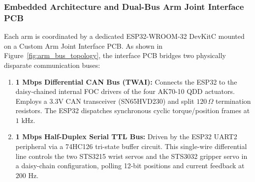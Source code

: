 \subsubsection{Embedded Architecture and Dual-Bus Arm Joint Interface PCB}
Each arm is coordinated by a dedicated ESP32-WROOM-32 DevKitC mounted on a Custom Arm Joint Interface PCB. As shown in Figure~\ref{fig:arm_bus_topology}, the interface PCB bridges two physically disparate communication buses:
\begin{enumerate}[leftmargin=1.5em]
  \item \textbf{1 Mbps Differential CAN Bus (TWAI):} Connects the ESP32 to the daisy-chained internal FOC drivers of the four AK70-10 QDD actuators. Employs a 3.3V CAN transceiver (SN65HVD230) and split $120\,\Omega$ termination resistors. The ESP32 dispatches synchronous cyclic torque/position frames at $1\text{ kHz}$.
  \item \textbf{1 Mbps Half-Duplex Serial TTL Bus:} Driven by the ESP32 UART2 peripheral via a 74HC126 tri-state buffer circuit. This single-wire differential line controls the two STS3215 wrist servos and the STS3032 gripper servo in a daisy-chain configuration, polling 12-bit positions and current feedback at $200\text{ Hz}$.
\end{enumerate}

